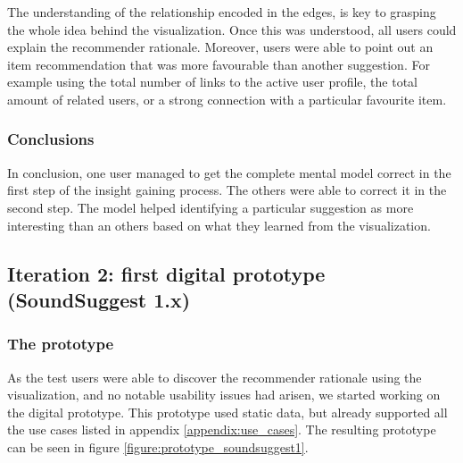 The understanding of the relationship encoded in the edges, is key to grasping the whole idea behind the visualization. Once this was understood, all users could explain the recommender rationale. Moreover, users were able to point out an item recommendation that was more favourable than another suggestion. For example using the total number of links to the active user profile, the total amount of related users, or a strong connection with a particular favourite item.


\subsubsection{Conclusions}\label{chapter:prototype:section:paper:conclusion}


In conclusion, one user managed to get the complete mental model correct in the first step of the insight gaining process. The others were able to correct it in the second step. The model helped identifying a particular suggestion as more interesting than an others based on what they learned from the visualization.






\subsection{Iteration 2: first digital prototype (SoundSuggest 1.x)}\label{chapter:prototype:section:soundsuggest1}

\subsubsection{The prototype}\label{chapter:prototype:section:soundsuggest1:prototype}

As the test users were able to discover the recommender rationale using the visualization, and no notable usability issues had arisen, we started working on the digital prototype. This prototype used static data, but already supported all the use cases listed in appendix \ref{appendix:use_cases}. The resulting prototype can be seen in figure \ref{figure:prototype_soundsuggest1}.


